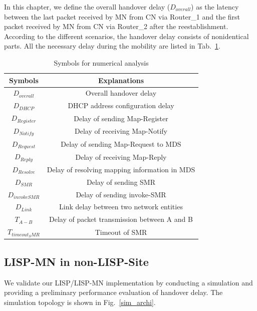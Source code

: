 In this chapter, we define the overall handover delay ($D_{overall}$) as the latency between the last packet received by MN from CN via Router\_1 and the first packet received by MN from CN via Router\_2 after the reestablishment. According to the different scenarios, the handover delay consists of nonidentical parts. All the necessary delay during the mobility are listed in Tab.~\ref{Symbols_numerical_analysis}.
\begin{table}[!tb]
	\centering
	\caption{Symbols for numerical analysis}
	\label{Symbols_numerical_analysis}{
		\begin{tabular}{@{}|c|c|@{}}
			\hline\hline
			Symbols & Explanations   \\ \hline
			$D_{overall}$ & Overall handover delay	\\  \hline    
			$D_{DHCP}$ &  DHCP address configuration delay \\  \hline    
			$D_{Register}$ &  Delay of sending Map-Register      	\\  \hline
			$D_{Notify}$ &  Delay of receiving Map-Notify      	\\  \hline           
			$D_{Request}$ &  Delay of sending Map-Request to MDS      	\\  \hline   
			$D_{Reply}$ &  Delay of receiving Map-Reply      	\\  \hline      
			$D_{Resolve}$ &  Delay of resolving mapping information in MDS      	\\  \hline               
			$D_{SMR}$ &  Delay of sending SMR       	\\  \hline 
			$D_{invokeSMR}$ &  Delay of sending invoke-SMR \\  \hline 
			$D_{Link}$ &  Link delay between two network entities \\  \hline 
			$T_{A-B}$ &  Delay of packet transmission between A and B     	\\  \hline
			$T_{timeout_SMR}$ &  Timeout of SMR     	\\  \hline  \hline               
		\end{tabular}
	}
\end{table}





\subsection{LISP-MN in non-LISP-Site}
\label{sec:ns3_analysis_lispmn}
We validate our LISP/LISP-MN implementation by conducting a simulation and providing a preliminary performance evaluation of handover delay. The simulation topology is shown in Fig.~\ref{sim_archi}.

